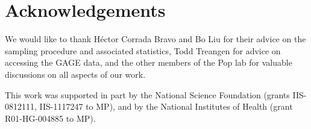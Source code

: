 \section{Acknowledgements}
We would like to thank H\'{e}ctor Corrada Bravo and Bo Liu for their advice on the sampling procedure and associated statistics, Todd Treangen for advice on accessing the GAGE data, and the other members of the Pop lab for valuable discussions on all aspects of our work.

This work was supported in part by the National Science Foundation
(grants IIS-0812111, IIS-1117247 to MP), and by the National
Institutes of Health (grant R01-HG-004885 to MP).














